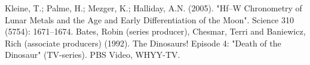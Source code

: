 \documentclass{article}
\begin{document}

\begin{thebibliography}{9}

 Kleine, T.; Palme, H.; Mezger, K.; Halliday, A.N. (2005). "Hf–W Chronometry of Lunar Metals and the Age and Early Differentiation of the Moon". Science 310 (5754): 1671–1674.
Bates, Robin (series producer), Chesmar, Terri and Baniewicz, Rich (associate producers) (1992). The Dinosaurs! Episode 4: "Death of the Dinosaur" (TV-series). PBS Video, WHYY-TV.

\end{thebibliography}
\end{document}
